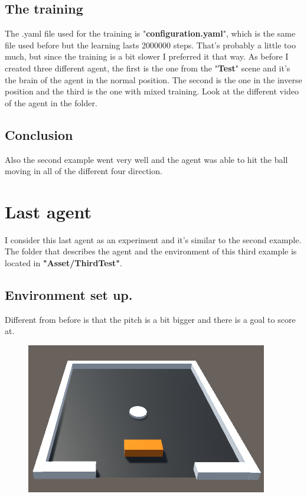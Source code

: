 \documentclass[12pt]{article}
\begin{document}
\begin{itemize}
	\end{itemize}	
	
	\subsection{The training}
	The .yaml file used for the training is "\textbf{configuration.yaml}", which is the same file used before but the learning lasts 2000000 steps. That's probably a little too much, but since the training is a bit slower I preferred it that way.
	As before I created three different agent, the first is the one from the "\textbf{Test}" scene and it's the brain of the agent in the normal position. The second is the one in the inverse position and the third is the one with mixed training.
	Look at the different video of the agent in the folder.
	
	\subsection{Conclusion}
	Also the second example went very well and the agent was able to hit the ball moving in all of the different four direction.
	
	\section{Last agent}
	I consider this last agent as an experiment and it's similar to the second example. The folder that describes the agent and the environment of this third example is located in \textbf{"Asset/ThirdTest"}.
	
	\subsection{Environment set up.}
	
	Different from before is that the pitch is a bit bigger and there is a goal to score at.
	
	\begin{figure}[hbt!]
		\centering
		\includegraphics[width= 1
		\textwidth]{images/NewField.png}
	\end{figure}
\end{document}
